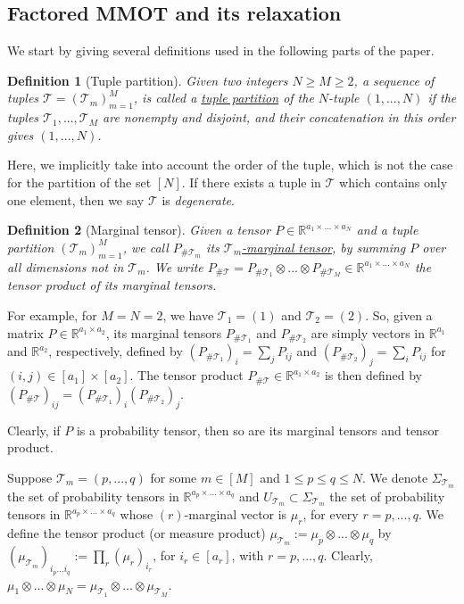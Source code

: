 \documentclass{article}
\newtheorem{definition}{Definition}[section]
\begin{document}
\subsection{Factored MMOT and its relaxation}
We start by giving several definitions used in the following parts of the paper. 
\begin{definition}[Tuple partition]
 Given two integers $N \geq M \geq 2$, a sequence of tuples $\mathcal T = (\mathcal T_m)_{m=1}^M$, is called a 
 \underline{tuple partition} of the $N$-tuple $(1,...,N)$ if the tuples $\mathcal T_1, ..., \mathcal T_M$ are nonempty and disjoint, 
 and their concatenation in this order gives $(1,...,N)$. 
\end{definition}
Here, we implicitly take into account the order of the tuple, which is not the case for the partition of the set $[N]$. If 
there exists a tuple in $\mathcal T$ which contains only one element, then we say $\mathcal T$ is \textit{degenerate}.

\begin{definition}[Marginal tensor]
  Given a tensor $P \in \mathbb R^{a_1 \times ... \times a_N}$ and a tuple partition $(\mathcal T_m)_{m=1}^M$, 
  we call $P_{\# \mathcal T_m}$ its \underline{$\mathcal T_m$-marginal tensor}, by summing $P$ over all dimensions not in $\mathcal T_m$. 
  We write $P_{\# \mathcal T} = P_{\# \mathcal T_1} \otimes ... \otimes P_{\# \mathcal T_M} \in \mathbb R^{a_1 \times ... \times a_N}$ 
  the tensor product of its marginal tensors. 
\end{definition}
For example, for $M=N=2$, we have $\mathcal T_1 = (1)$ and $\mathcal T_2 = (2)$. So, given a matrix 
$P \in \mathbb R^{a_1 \times a_2}$, its marginal tensors $P_{\# \mathcal T_1}$ and $P_{\# \mathcal T_2}$ are simply vectors in 
$\mathbb R^{a_1}$ and $\mathbb R^{a_2}$, respectively, defined by $(P_{\# \mathcal T_1})_i = \sum_j P_{ij}$ and 
$(P_{\# \mathcal T_2})_j = \sum_i P_{ij}$ for $(i,j) \in [a_1] \times [a_2]$. The tensor product 
$P_{\# \mathcal T} \in \mathbb R^{a_1 \times a_2}$ is then defined by 
$(P_{\#\mathcal T})_{ij} = (P_{\# \mathcal T_1})_i (P_{\# \mathcal T_2})_j$.

Clearly, if $P$ is a probability tensor, then so are its marginal tensors and tensor product.

Suppose $\mathcal T_m = (p,...,q)$ for some $m \in [M]$ and $1 \leq p \leq q \leq N$. We denote 
$\Sigma_{\mathcal T_m}$ the set of probability tensors in $\mathbb R^{a_p \times ... \times a_q}$ and 
$U_{\mathcal T_m} \subset \Sigma_{\mathcal T_m}$ the set 
of probability tensors in $\mathbb R^{a_p \times ... \times a_q}$ whose $(r)$-marginal vector is $\mu_r$, for every $r = p,...,q$. 
We define the tensor product (or measure product) $\mu_{\mathcal T_m} := \mu_p \otimes ... \otimes \mu_q$ by 
$(\mu_{\mathcal T_m})_{i_p...i_q} := \prod_r (\mu_r)_{i_r}$, for $i_r \in [a_r]$, with $r=p,...,q$. Clearly, 
$\mu_1 \otimes ... \otimes \mu_N = \mu_{\mathcal T_1} \otimes ... \otimes \mu_{\mathcal T_M}$.
\end{document}
